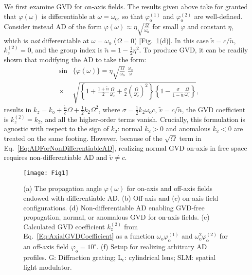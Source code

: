 \documentclass[reprint,
 amsmath,amssymb,
 aps,
]{revtex4-2}
\begin{document}
We first examine GVD for on-axis fields. The results given above take for granted that $\varphi(\omega)$ is differentiable at $\omega\!=\!\omega_{\mathrm{o}}$, so that $\varphi_{\mathrm{o}}^{(1)}$ and $\varphi_{\mathrm{o}}^{(2)}$ are well-defined. Consider instead AD of the form $\varphi(\omega)\!\approx\!\eta\sqrt{\tfrac{\Omega}{\omega_{\mathrm{o}}}}$ for small $\varphi$ and constant $\eta$, which is \textit{not} differentiable at $\omega\!=\!\omega_{\mathrm{o}}$ ($\Omega\!=\!0$) [Fig.~\ref{Fig:ConceptSetup}(d)]. In this case $\widetilde{v}\!=\!c/\widetilde{n}$, $k_{z}^{(2)}\!=\!0$, and the group index is $\widetilde{n}\!=\!1-\tfrac{1}{2}\eta^{2}$. To produce GVD, it can be readily shown that modifying the AD to take the form:
\begin{eqnarray}\label{Eq:ADForNonDifferentiableAD}
&\sin&\!\!\!\!\!\!{\{\varphi(\omega)\}}=\eta\sqrt{\frac{\Omega}{\omega_{\mathrm{o}}}}\;\frac{\omega_{\mathrm{o}}}{\omega}\nonumber\\&\times&\!\!\!\!\!\sqrt{\left\{1+\frac{1+\widetilde{n}}{2}\frac{\Omega}{\omega_{\mathrm{o}}}+\frac{\sigma}{2}\left(\frac{\Omega}{\omega_{\mathrm{o}}}\right)^{2}\right\}\left\{1-\frac{\sigma}{1-\widetilde{n}}\frac{\Omega}{\omega_{\mathrm{o}}}\right\}},
\end{eqnarray}
results in $k_{z}\!=\!k_{\mathrm{o}}+\tfrac{\widetilde{n}}{c}\Omega+\tfrac{1}{2}k_{2}\Omega^{2}$, where $\sigma\!=\!\tfrac{1}{2}k_{2}\omega_{\mathrm{o}}c$, $\widetilde{v}\!=\!c/\widetilde{n}$, the GVD coefficient is $k_{z}^{(2)}\!=\!k_{2}$, and all the higher-order terms vanish. Crucially, this formulation is agnostic with respect to the sign of $k_{2}$: normal $k_{2}\!>\!0$ and anomalous $k_{2}\!<\!0$ are treated on the same footing. However, because of the $\sqrt{\Omega}$ term in Eq.~\ref{Eq:ADForNonDifferentiableAD}, realizing normal GVD on-axis in free space requires non-differentiable AD and $\widetilde{v}\!\neq\!c$.

\begin{figure}[t!]
\centering
\texttt{[image: Fig1]}
\caption{(a) The propagation angle $\varphi(\omega)$ for on-axis and off-axis fields endowed with differentiable AD. (b) Off-axis and (c) on-axis field configurations. (d) Non-differentiable AD enabling GVD-free propagation, normal, or anomalous GVD for on-axis fields. (e) Calculated GVD coefficient $k_{z}^{(2)}$ from Eq.~\ref{Eq:AxialGVDCoefficient} as a function $\omega_{\mathrm{o}}\varphi_{\mathrm{o}}^{(1)}$ and $\omega_{\mathrm{o}}^{2}\varphi_{\mathrm{o}}^{(2)}$ for an off-axis field $\varphi_{\mathrm{o}}\!=\!10^{\circ}$. (f) Setup for realizing arbitrary AD profiles. G: Diffraction grating; L$_\mathrm{c}$: cylindrical lens; SLM: spatial light modulator.}
\label{Fig:ConceptSetup}
\end{figure}
\end{document}

